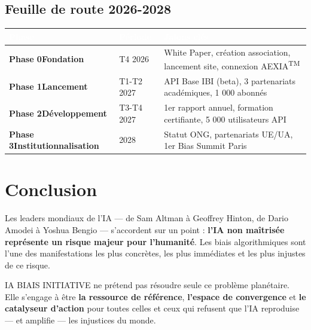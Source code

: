 \documentclass[11pt,a4paper,openany]{book}
\begin{document}
\vspace{0.5cm}

\section{Feuille de route 2026-2028}

\begin{center}
\renewcommand{\arraystretch}{1.3}
\small
\begin{tabularx}{\textwidth}{@{}>{\bfseries}p{3cm}p{2cm}X@{}}
\toprule
\rowcolor{navy}
\textcolor{white}{Phase} & \textcolor{white}{Période} & \textcolor{white}{Jalons clés} \\
\midrule
\textbf{Phase 0}\newline Fondation & T4 2026 & White Paper, création association, lancement site, connexion AEXIA\textsuperscript{TM} \\
\rowcolor{light}
\textbf{Phase 1}\newline Lancement & T1-T2 2027 & API Base IBI (beta), 3 partenariats académiques, 1 000 abonnés \\
\textbf{Phase 2}\newline Développement & T3-T4 2027 & 1er rapport annuel, formation certifiante, 5 000 utilisateurs API \\
\rowcolor{light}
\textbf{Phase 3}\newline Institutionnalisation & 2028 & Statut ONG, partenariats UE/UA, 1er Bias Summit Paris \\
\bottomrule
\end{tabularx}
\end{center}

\chapter{Conclusion}

Les leaders mondiaux de l'IA — de Sam Altman à Geoffrey Hinton, de Dario Amodei à Yoshua Bengio — s'accordent sur un point : \textbf{l'IA non maîtrisée représente un risque majeur pour l'humanité}. Les biais algorithmiques sont l'une des manifestations les plus concrètes, les plus immédiates et les plus injustes de ce risque.

\vspace{0.3cm}

IA BIAIS INITIATIVE ne prétend pas résoudre seule ce problème planétaire. Elle s'engage à être \textbf{la ressource de référence}, \textbf{l'espace de convergence} et \textbf{le catalyseur d'action} pour toutes celles et ceux qui refusent que l'IA reproduise — et amplifie — les injustices du monde.
\end{document}
